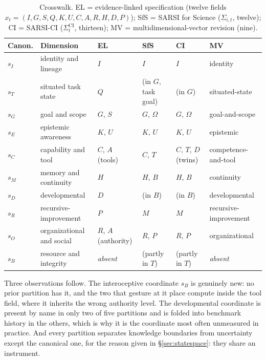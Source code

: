 \documentclass[11pt]{article}
\begin{document}
\begin{table}[h]
\centering\footnotesize
\caption{Crosswalk. EL = evidence-linked specification (twelve fields $x_t = (I,G,S,Q,K,U,C,A,R,H,D,P)$); SfS = SARSI for Science ($\Sigma_{i,t}$, twelve); CI = SARSI-CI ($\Sigma^{\mathrm{CI}}_t$, thirteen); MV = multidimensional-vector revision (nine).}
\label{tab:crosswalk}
\begin{tabular}{p{1.1cm} p{2.9cm} p{2.6cm} p{2.9cm} p{2.9cm} p{2.2cm}}
\toprule
\textbf{Canon.} & \textbf{Dimension} & \textbf{EL} & \textbf{SfS} & \textbf{CI} & \textbf{MV} \\
\midrule
$s_I$ & identity and lineage & $I$ & $I$ & $I$ & identity \\
$s_T$ & situated task state & $Q$ & (in $G$, task goal) & (in $G$) & situated-state \\
$s_G$ & goal and scope & $G$, $S$ & $G$, $\Omega$ & $G$, $\Omega$ & goal-and-scope \\
$s_E$ & epistemic awareness & $K$, $U$ & $K$, $U$ & $K$, $U$ & epistemic \\
$s_C$ & capability and tool & $C$, $A$ (tools) & $C$, $T$ & $C$, $T$, $D$ (twins) & competence-and-tool \\
$s_M$ & memory and continuity & $H$ & $H$, $B$ & $H$, $B$ & continuity \\
$s_D$ & developmental & $D$ & (in $B$) & (in $B$) & developmental \\
$s_R$ & recursive-improvement & $P$ & $M$ & $M$ & recursive-improvement \\
$s_O$ & organizational and social & $R$, $A$ (authority) & $R$, $P$ & $R$, $P$ & organizational \\
$s_B$ & resource and integrity & \emph{absent} & (partly in $T$) & (partly in $T$) & \emph{absent} \\
\bottomrule
\end{tabular}
\end{table}

Three observations follow. The interoceptive coordinate $s_B$ is genuinely new: no prior partition has it, and the two that gesture at it place compute inside the tool field, where it inherits the wrong authority level. The developmental coordinate is present by name in only two of five partitions and is folded into benchmark history in the others, which is why it is the coordinate most often unmeasured in practice. And every partition separates knowledge boundaries from uncertainty except the canonical one, for the reason given in \S\ref{sec:statespace}: they share an instrument.
\end{document}
